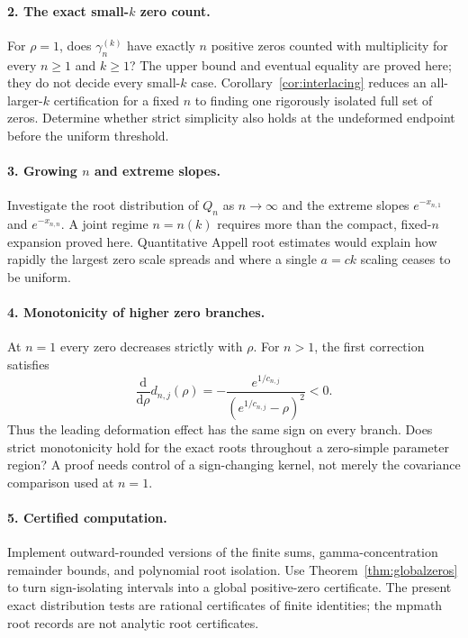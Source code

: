 \documentclass[11pt]{article}
\theoremstyle{definition}
\theoremstyle{remark}
\begin{document}
\paragraph{2. The exact small-$k$ zero count.}
For $\rho=1$, does $\gamma_n^{(k)}$ have exactly $n$ positive zeros counted with multiplicity for every $n\geq1$ and $k\geq1$? The upper bound and eventual equality are proved here; they do not decide every small-$k$ case. Corollary~\ref{cor:interlacing} reduces an all-larger-$k$ certification for a fixed $n$ to finding one rigorously isolated full set of zeros. Determine whether strict simplicity also holds at the undeformed endpoint before the uniform threshold.

\paragraph{3. Growing $n$ and extreme slopes.}
Investigate the root distribution of $Q_n$ as $n\to\infty$ and the extreme slopes $e^{-x_{n,1}}$ and $e^{-x_{n,n}}$. A joint regime $n=n(k)$ requires more than the compact, fixed-$n$ expansion proved here. Quantitative Appell root estimates would explain how rapidly the largest zero scale spreads and where a single $a=ck$ scaling ceases to be uniform.

\paragraph{4. Monotonicity of higher zero branches.}
At $n=1$ every zero decreases strictly with $\rho$. For $n>1$, the first correction satisfies
\[
 \frac{\mathrm d}{\mathrm d\rho}d_{n,j}(\rho)
    =-\frac{e^{1/c_{n,j}}}{(e^{1/c_{n,j}}-\rho)^2}<0.
\]
Thus the leading deformation effect has the same sign on every branch. Does strict monotonicity hold for the exact roots throughout a zero-simple parameter region? A proof needs control of a sign-changing kernel, not merely the covariance comparison used at $n=1$.

\paragraph{5. Certified computation.}
Implement outward-rounded versions of the finite sums, gamma-concentration remainder bounds, and polynomial root isolation. Use Theorem~\ref{thm:globalzeros} to turn sign-isolating intervals into a global positive-zero certificate. The present exact distribution tests are rational certificates of finite identities; the mpmath root records are not analytic root certificates.
\end{document}
